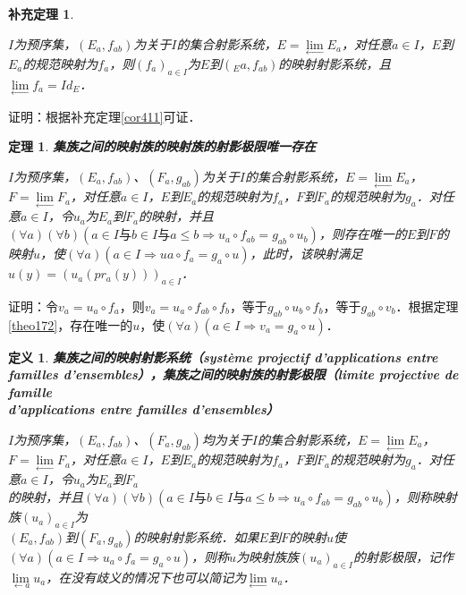 \documentclass[12pt, a4paper, oneside]{book}
\newtheorem{theo}{定理}
\newtheorem{cor}{补充定理}
\newtheorem{de}{定义}
\begin{document}
			\begin{cor}\label{cor417}
				\hfill\par
				$I$为预序集，$(E_a, f_{ab})$为关于$I$的集合射影系统，$E= \lim\limits_\gets E_a$，对任意$a\in I$，$E$到$E_a$的规范映射为$f_a$，则$(f_a)_{a\in I}$为$E$到$(_Ea, f_{ab})$的映射射影系统，且$\lim\limits_\gets f_a=Id_E$．
			\end{cor}
			证明：根据补充定理\ref{cor411}可证．
					
			\begin{theo}\label{theo173}
				\textbf{集族之间的映射族的映射族的射影极限唯一存在}
				\par
				$I$为预序集，$(E_a, f_{ab})$、$(F_a, g_{ab})$为关于$I$的集合射影系统，$E= \lim\limits_\gets E_a$，$F= \lim\limits_\gets F_a$，对任意$a\in I$，$E$到$E_a$的规范映射为$f_a$，$F$到$F_a$的规范映射为$g_a$．对任意$a\in I$，令$u_a$为$E_a$到$F_a$的映射，并且$(\forall a)(\forall b)(a\in I\text{与}b\in I\text{与}a\leq b\Rightarrow u_a\circ f_{ab}=g_{ab}\circ u_b)$，则存在唯一的$E$到$F$的映射$u$，使$(\forall a)(a\in I\Rightarrow ua\circ f_a=g_a\circ u)$，此时，该映射满足$u(y)=(u_a(pr_a(y)))_{a\in I}$．
			\end{theo}
			证明：令$v_a=u_a\circ f_a$，则$v_a= u_a\circ f_{ab}\circ f_b$，等于$g_{ab}\circ u_b\circ f_b$，等于$g_{ab}\circ v_b$．根据定理\ref{theo172}，存在唯一的$u$，使$(\forall a)(a\in I\Rightarrow v_a=g_a\circ u)$．
			
			\begin{de}
				\textbf{集族之间的映射射影系统（système projectif d'applications entre familles d'ensembles），集族之间的映射族的射影极限（limite projective de famille \\d'applications entre familles d'ensembles）}
				\par
				$I$为预序集，$(E_a, f_{ab})$、$(F_a, g_{ab})$均为关于$I$的集合射影系统，$E= \lim\limits_\gets E_a$，$F= \lim\limits_\gets F_a$，对任意$a\in I$，$E$到$E_a$的规范映射为$f_a$，$F$到$F_a$的规范映射为$g_a$．对任意$a\in I$，令$u_a$为$E_a$到$F_a$\\的映射，并且$(\forall a)(\forall b)(a\in I\text{与}b\in I\text{与}a\leq b\Rightarrow u_a\circ f_{ab}=g_{ab}\circ u_b)$，则称映射族$(u_a)_{a\in I}$为\\$(E_a, f_{ab})$到$(F_a, g_{ab})$的映射射影系统．如果$E$到$F$的映射$u$使$(\forall a)(a\in I\Rightarrow u_a\circ f_a=g_a\circ u)$，则称$u$为映射族族$(u_a)_{a\in I}$的射影极限，记作$\lim\limits_{\gets a} u_a$，在没有歧义的情况下也可以简记为$\lim\limits_\gets u_a$．
			\end{de}
					
\end{document}

